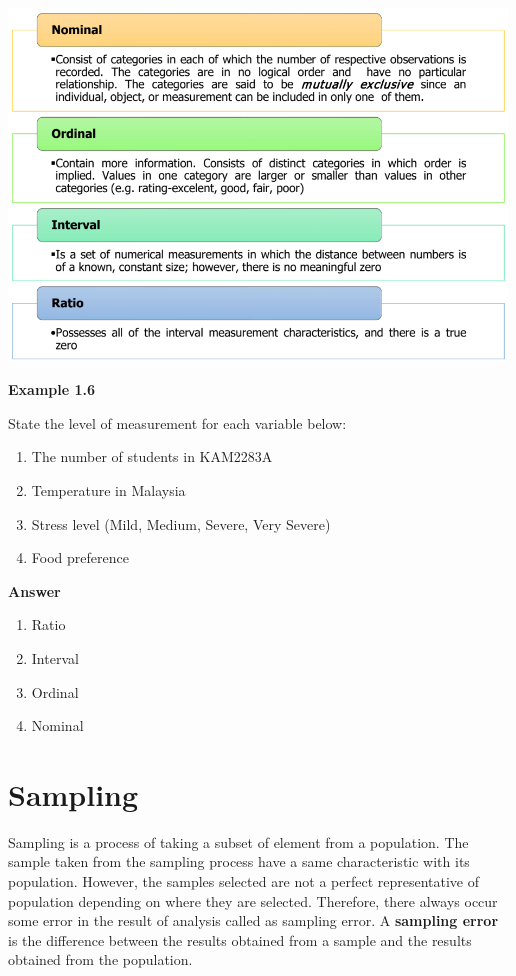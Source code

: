 \documentclass[
  a4paper,
  DIV=11,
  numbers=noendperiod,
  oneside]{scrreprt}
\providecommand{\tightlist}{%
  \setlength{\itemsep}{0pt}\setlength{\parskip}{0pt}}\usepackage{longtable,booktabs,array}
\begin{document}
\includegraphics[width=5.20833in,height=\textheight]{images/ch1/Picture8.png}

{\textbf{Example 1.6}}

State the level of measurement for each variable below:

\begin{enumerate}
\def\labelenumi{\alph{enumi})}
\tightlist
\item
  The number of students in KAM2283A
\item
  Temperature in Malaysia
\item
  Stress level (Mild, Medium, Severe, Very Severe)
\item
  Food preference
\end{enumerate}

{\textbf{Answer}}

\begin{enumerate}
\def\labelenumi{\alph{enumi})}
\tightlist
\item
  Ratio
\item
  Interval
\item
  Ordinal
\item
  Nominal
\end{enumerate}

\hypertarget{sampling}{%
\section{Sampling}\label{sampling}}

Sampling is a process of taking a subset of element from a population.
The sample taken from the sampling process have a same characteristic
with its population. However, the samples selected are not a perfect
representative of population depending on where they are selected.
Therefore, there always occur some error in the result of analysis
called as sampling error. A \textbf{sampling error} is the difference
between the results obtained from a sample and the results obtained from
the population.
\end{document}
